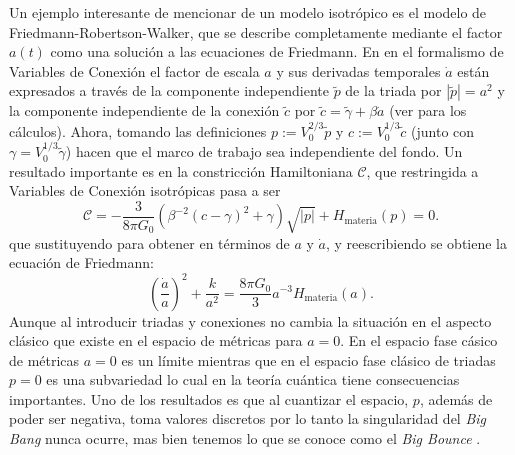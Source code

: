 Un ejemplo interesante de mencionar de un modelo isotr\'{o}pico es el modelo de Friedmann-Robertson-Walker, que se describe completamente mediante el factor $a(t)$ como una soluci\'{o}n a las ecuaciones de Friedmann. En en el formalismo de Variables de Conexi\'{o}n el factor de escala $a$ y sus derivadas temporales $\dot{a}$ est\'{a}n expresados a trav\'{e}s de la componente independiente $\tilde{p}$ de la triada por $|\tilde{p}| = a^{2}$ y la componente independiente de la conexi\'{o}n $\tilde{c}$ por $\tilde{c} = \tilde{\gamma} + \beta \dot{a}$ (ver \cite{Bojowald2000} para los c\'{a}lculos). Ahora, tomando las definiciones $p := V_{0}^{2/3} \tilde{p}$ y $c := V_{0}^{1/3} \tilde{c}$ (junto con $\gamma = V^{1/3}_{0} \tilde{\gamma}$) hacen que el marco de trabajo sea independiente del fondo. Un resultado importante es en la constricci\'{o}n Hamiltoniana $\mathcal{C}$, que restringida a Variables de Conexi\'{o}n isotr\'{o}picas pasa a ser \cite{Bojowald2002, Bojowald2005}
%
\begin{equation}
\mathcal{C} = -\frac{3}{8 \pi G_{0}} \left( \beta^{-2} (c - \gamma)^{2} + \gamma \right) \sqrt{|p|} + H_{\mathrm{materia}} (p) = 0.
\end{equation}
%
que sustituyendo para obtener en t\'{e}rminos de $a$ y $\dot{a}$, y reescribiendo se obtiene la ecuaci\'{o}n de Friedmann:
%
\begin{equation}
\left( \frac{\dot{a}}{a} \right)^{2} + \frac{k}{a^{2}} = \frac{8 \pi G_{0}}{3} a^{-3} H_{\mathrm{materia}}(a).
\end{equation}
%
Aunque al introducir triadas y conexiones no cambia la situaci\'{o}n en el aspecto cl\'{a}sico que existe en el espacio de m\'{e}tricas para $a = 0$. En el espacio fase c\'{a}sico de m\'{e}tricas $a = 0$ es un l\'{i}mite mientras que en el espacio fase cl\'{asico} de triadas $p = 0$ es una subvariedad lo cual en la teor\'{i}a cu\'{a}ntica tiene consecuencias importantes. {\color{red} Uno de los resultados es que al cuantizar el espacio, $p$, adem\'{a}s de poder ser negativa, toma valores discretos por lo tanto la singularidad del \emph{Big Bang} nunca ocurre, mas bien tenemos lo que se conoce como el \emph{Big Bounce} \cite{BojowaldBBB}.}
